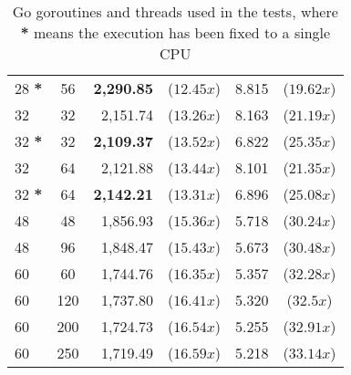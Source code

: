 \begin{table}
\begin{tabular}{lcrcrc}
    28 \textbf{*} & 56         &  \textbf{2,290.85} & ($12.45x$)         &    8.815          &  ($19.62x$)           \\
    32            & 32         &  2,151.74          & ($13.26x$)         &    8.163          &  ($21.19x$)           \\
    32 \textbf{*} & 32         &  \textbf{2,109.37} & ($13.52x$)         &    6.822          &  ($25.35x$)           \\
    32            & 64         &  2,121.88          & ($13.44x$)         &    8.101          &  ($21.35x$)           \\
    32 \textbf{*} & 64         &  \textbf{2,142.21} & ($13.31x$)         &    6.896          &  ($25.08x$)           \\
    48            & 48         &  1,856.93          & ($15.36x$)         &    5.718          &  ($30.24x$)           \\
    48            & 96         &  1,848.47          & ($15.43x$)         &    5.673          &  ($30.48x$)           \\
    60            & 60         &  1,744.76          & ($16.35x$)         &    5.357          &  ($32.28x$)           \\
    60            & 120        &  1,737.80          & ($16.41x$)         &    5.320          &  ($32.5x$)            \\
    60            & 200        &  1,724.73          & ($16.54x$)         &    5.255          &  ($32.91x$)           \\
    60            & 250        &  1,719.49          & ($16.59x$)         &    5.218          &  ($33.14x$)           \\
    \bottomrule
  \end{tabular}
  \caption[Go goroutines and threads]{Go goroutines and threads used in the tests, where \textbf{*} means the execution has been fixed to a single CPU}
  \label{tab:go-routines-cores}
\end{table}
